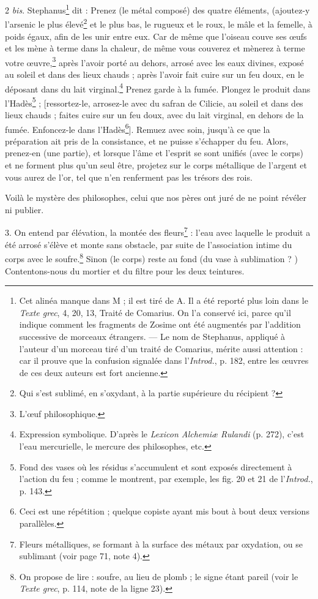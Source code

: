 \documentclass[landscape, a4paper, 11pt, oneside, polutonikogreek, french]{article}
\begin{document}
2 \emph{bis}. Stephanus\footnote{Cet alinéa manque dans M ; il est tiré de A. Il a été reporté plus loin dans le \emph{Texte grec}, 4, 20, 13, Traité de Comarius. On l'a conservé ici, parce qu'il indique comment les fragments de Zosime ont été augmentés par l'addition successive de morceaux étrangers. --- Le nom de Stephanus, appliqué à l'auteur d'un morceau tiré d'un traité de Comarius, mérite aussi attention : car il prouve que la confusion signalée dans l'\emph{Introd.}, p. 182, entre les œuvres de ces deux auteurs est fort ancienne.} dit : Prenez (le métal composé) des quatre éléments, (ajoutez-y l'arsenic le plus élevé\footnote{Qui s'est sublimé, en s'oxydant, à la partie supérieure du récipient ?} et le plus bas, le rugueux et le roux, le mâle et la femelle, à poids égaux, afin de les unir entre eux. Car de même que l'oiseau couve ses œufs et les mène à terme dans la chaleur, de même vous couverez et mènerez à terme votre œuvre,\footnote{L'œuf philosophique.} après l'avoir porté au dehors, arrosé avec les eaux divines, exposé au soleil et dans des lieux chauds ; après l'avoir fait cuire sur un feu doux, en le déposant dans du lait virginal.\footnote{Expression symbolique. D'après le \emph{Lexicon Alchemiæ Rulandi} (p. 272), c'est l'eau mercurielle, le mercure des philosophes, etc.} Prenez garde à la fumée. Plongez le produit dans l'Hadès\footnote{Fond des vases où les résidus s'accumulent et sont exposés directement à l'action du feu ; comme le montrent, par exemple, les fig. 20 et 21 de l'\emph{Introd.}, p. 143.} ; [ressortez-le, arrosez-le avec du safran de Cilicie, au soleil et dans des lieux chauds ; faites cuire sur un feu doux, avec du lait virginal, en dehors de la fumée. Enfoncez-le dans l'Hadès\footnote{Ceci est une répétition ; quelque copiste ayant mis bout à bout deux versions parallèles.}]. Remuez avec soin, jusqu'à ce que la préparation ait pris de la consistance, et ne puisse s'échapper du feu. Alors, prenez-en (une partie), et lorsque l'âme et l'esprit se sont unifiés (avec le corps) et ne forment plus qu'un seul être, projetez sur le corps métallique de l'argent et vous aurez de l'or, tel que n'en renferment pas les trésors des rois.

Voilà le mystère des philosophes, celui que nos pères ont juré de ne point révéler ni publier.

3. On entend par élévation, la montée des fleurs\footnote{Fleurs métalliques, se formant à la surface des métaux par oxydation, ou se sublimant (voir page 71, note 4).} : l'eau avec laquelle le produit a été arrosé s'élève et monte sans obstacle, par suite de l'association intime du corps avec le soufre.\footnote{On propose de lire : soufre, au lieu de plomb ; le signe étant pareil (voir le \emph{Texte grec}, p. 114, note de la ligne 23).} Sinon (le corps) reste au fond (du vase à sublimation ? ) Contentons-nous du mortier et du filtre pour les deux teintures.
\end{document}
